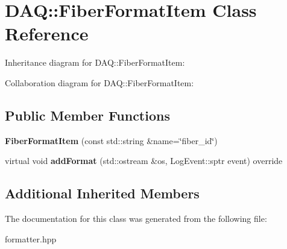 \hypertarget{classDAQ_1_1FiberFormatItem}{}\section{D\+AQ\+:\+:Fiber\+Format\+Item Class Reference}
\label{classDAQ_1_1FiberFormatItem}


Inheritance diagram for D\+AQ\+:\+:Fiber\+Format\+Item\+:


Collaboration diagram for D\+AQ\+:\+:Fiber\+Format\+Item\+:
\subsection*{Public Member Functions}
\begin{DoxyCompactItemize}
\item 
\mbox{\label{classDAQ_1_1FiberFormatItem_abfb08bf48f295da83e210e31e8f92a1d}} 
{\bfseries Fiber\+Format\+Item} (const std\+::string \&name=\char`\"{}fiber\+\_\+id\char`\"{})
\item 
\mbox{\label{classDAQ_1_1FiberFormatItem_a587523d1fd868dbe0ea118dfd36e7e3f}} 
virtual void {\bfseries add\+Format} (std\+::ostream \&os, Log\+Event\+::sptr event) override
\end{DoxyCompactItemize}
\subsection*{Additional Inherited Members}


The documentation for this class was generated from the following file\+:\begin{DoxyCompactItemize}
\item 
formatter.\+hpp\end{DoxyCompactItemize}
